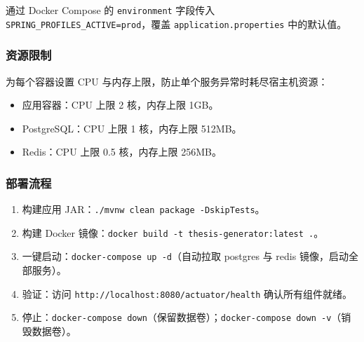 \documentclass{../../softeng}
\begin{document}
通过 Docker Compose 的 \texttt{environment} 字段传入 \texttt{SPRING\_PROFILES\_ACTIVE=prod}，覆盖 \texttt{application.properties} 中的默认值。

\subsubsection{资源限制}

为每个容器设置 CPU 与内存上限，防止单个服务异常时耗尽宿主机资源：

\begin{itemize}
    \item 应用容器：CPU 上限 2 核，内存上限 1GB。
    \item PostgreSQL：CPU 上限 1 核，内存上限 512MB。
    \item Redis：CPU 上限 0.5 核，内存上限 256MB。
\end{itemize}

\subsubsection{部署流程}

\begin{enumerate}
    \item 构建应用 JAR：\texttt{./mvnw clean package -DskipTests}。
    \item 构建 Docker 镜像：\texttt{docker build -t thesis-generator:latest .}。
    \item 一键启动：\texttt{docker-compose up -d}（自动拉取 postgres 与 redis 镜像，启动全部服务）。
    \item 验证：访问 \texttt{http://localhost:8080/actuator/health} 确认所有组件就绪。
    \item 停止：\texttt{docker-compose down}（保留数据卷）；\texttt{docker-compose down -v}（销毁数据卷）。
\end{enumerate}
\end{document}
